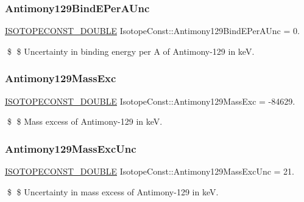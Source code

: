 \subsubsection{\texorpdfstring{Antimony129\+Bind\+E\+Per\+A\+Unc}{Antimony129BindEPerAUnc}}
{\footnotesize\ttfamily \mbox{\hyperlink{group___isotope_const-_macros_ga8f45a7272ce02c0b4c65c44636ed719a}{I\+S\+O\+T\+O\+P\+E\+C\+O\+N\+S\+T\+\_\+\+D\+O\+U\+B\+LE}} Isotope\+Const\+::\+Antimony129\+Bind\+E\+Per\+A\+Unc = 0.}

\$ \$ Uncertainty in binding energy per A of Antimony-\/129 in keV. \mbox{\label{group___isotope_const-_antimony-_sb129_gafdb020dbaf390a1ea44020411ec70aaa}} 
\subsubsection{\texorpdfstring{Antimony129\+Mass\+Exc}{Antimony129MassExc}}
{\footnotesize\ttfamily \mbox{\hyperlink{group___isotope_const-_macros_ga8f45a7272ce02c0b4c65c44636ed719a}{I\+S\+O\+T\+O\+P\+E\+C\+O\+N\+S\+T\+\_\+\+D\+O\+U\+B\+LE}} Isotope\+Const\+::\+Antimony129\+Mass\+Exc = -\/84629.}

\$ \$ Mass excess of Antimony-\/129 in keV. \mbox{\label{group___isotope_const-_antimony-_sb129_gaf78cf8fa8cf7b1e80390739da0754437}} 
\subsubsection{\texorpdfstring{Antimony129\+Mass\+Exc\+Unc}{Antimony129MassExcUnc}}
{\footnotesize\ttfamily \mbox{\hyperlink{group___isotope_const-_macros_ga8f45a7272ce02c0b4c65c44636ed719a}{I\+S\+O\+T\+O\+P\+E\+C\+O\+N\+S\+T\+\_\+\+D\+O\+U\+B\+LE}} Isotope\+Const\+::\+Antimony129\+Mass\+Exc\+Unc = 21.}

\$ \$ Uncertainty in mass excess of Antimony-\/129 in keV. \mbox{\label{group___isotope_const-_antimony-_sb129_gaf356b6436e04e053ff3d594ac5e14d5c}} 
